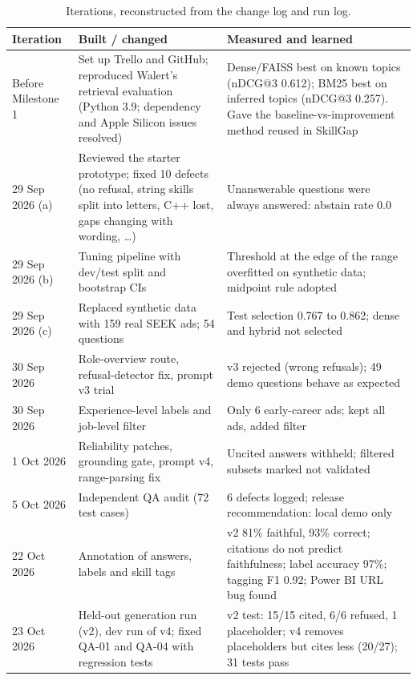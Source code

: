 \begin{table}[H]
\caption{Iterations, reconstructed from the change log and run log.}\label{tab:iter}
\small
\begin{tabularx}{\linewidth}{lYY}
\toprule
Iteration & Built / changed & Measured and learned \\
\midrule
Before Milestone 1 & Set up Trello and GitHub; reproduced Walert's retrieval evaluation (Python 3.9; dependency and Apple Silicon issues resolved) & Dense/FAISS best on known topics (nDCG@3 0.612); BM25 best on inferred topics (nDCG@3 0.257). Gave the baseline-vs-improvement method reused in SkillGap \\
29 Sep 2026 (a) & Reviewed the starter prototype; fixed 10 defects (no refusal, string skills split into letters, C++ lost, gaps changing with wording, \dots) & Unanswerable questions were always answered: abstain rate 0.0 \\
29 Sep 2026 (b) & Tuning pipeline with dev/test split and bootstrap CIs & Threshold at the edge of the range overfitted on synthetic data; midpoint rule adopted \\
29 Sep 2026 (c) & Replaced synthetic data with 159 real SEEK ads; 54 questions & Test selection 0.767 to 0.862; dense and hybrid not selected \\
30 Sep 2026 & Role-overview route, refusal-detector fix, prompt v3 trial & v3 rejected (wrong refusals); 49 demo questions behave as expected \\
30 Sep 2026 & Experience-level labels and job-level filter & Only 6 early-career ads; kept all ads, added filter \\
1 Oct 2026 & Reliability patches, grounding gate, prompt v4, range-parsing fix & Uncited answers withheld; filtered subsets marked not validated \\
5 Oct 2026 & Independent QA audit (72 test cases) & 6 defects logged; release recommendation: local demo only \\
22 Oct 2026 & Annotation of answers, labels and skill tags & v2 81\% faithful, 93\% correct; citations do not predict faithfulness; label accuracy 97\%; tagging F1 0.92; Power BI URL bug found \\
23 Oct 2026 & Held-out generation run (v2), dev run of v4; fixed QA-01 and QA-04 with regression tests & v2 test: 15/15 cited, 6/6 refused, 1 placeholder; v4 removes placeholders but cites less (20/27); 31 tests pass \\
\bottomrule
\end{tabularx}
\end{table}

